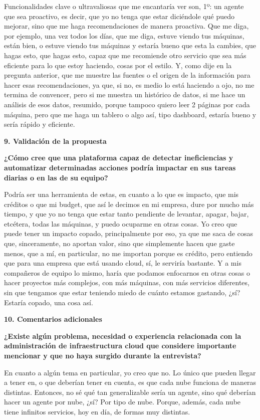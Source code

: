 Funcionalidades clave o ultravaliosas que me encantaría ver son, 1º: un agente que sea proactivo, es decir, que yo no tenga que estar diciéndole qué puedo mejorar, sino que me haga recomendaciones de manera proactiva. Que me diga, por ejemplo, una vez todos los días, que me diga, estuve viendo tus máquinas, están bien, o estuve viendo tus máquinas y estaría bueno que esta la cambies, que hagas esto, que hagas esto, capaz que me recomiende otro servicio que sea más eficiente para lo que estoy haciendo, cosas por el estilo. Y, como dije en la pregunta anterior, que me muestre las fuentes o el origen de la información para hacer esas recomendaciones, ya que, si no, es medio lo está haciendo a ojo, no me termina de convencer, pero si me muestra un histórico de datos, si me hace un análisis de esos datos, resumido, porque tampoco quiero leer 2 páginas por cada máquina, pero que me haga un tablero o algo así, tipo dashboard, estaría bueno y sería rápido y eficiente.

\textbf{9. Validación de la propuesta}

\textbf{¿Cómo cree que una plataforma capaz de detectar ineficiencias y automatizar determinadas acciones podría impactar en sus tareas diarias o en las de su equipo?}

Podría ser una herramienta de estas, en cuanto a lo que es impacto, que mis créditos o que mi budget, que así le decimos en mi empresa, dure por mucho más tiempo, y que yo no tenga que estar tanto pendiente de levantar, apagar, bajar, etcétera, todas las máquinas, y puedo ocuparme en otras cosas. Yo creo que puede tener un impacto copado, principalmente por eso, ya que me saca de cosas que, sinceramente, no aportan valor, sino que simplemente hacen que gaste menos, que a mí, en particular, no me importan porque es crédito, pero entiendo que para una empresa que está usando cloud, sí, le serviría bastante. Y a mis compañeros de equipo lo mismo, haría que podamos enfocarnos en otras cosas o hacer proyectos más complejos, con más máquinas, con más servicios diferentes, sin que tengamos que estar teniendo miedo de cuánto estamos gastando, ¿sí? Estaría copado, una cosa así.

\textbf{10. Comentarios adicionales}

\textbf{¿Existe algún problema, necesidad o experiencia relacionada con la administración de infraestructura cloud que considere importante mencionar y que no haya surgido durante la entrevista?}

En cuanto a algún tema en particular, yo creo que no. Lo único que pueden llegar a tener en, o que deberían tener en cuenta, es que cada nube funciona de maneras distintas. Entonces, no sé qué tan generalizable sería un agente, sino qué deberían hacer un agente por nube, ¿sí? Por tipo de nube. Porque, además, cada nube tiene infinitos servicios, hoy en día, de formas muy distintas.


